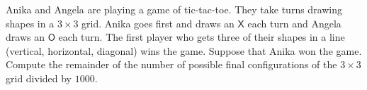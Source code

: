 Anika and Angela are playing a game of tic-tac-toe. They take turns drawing shapes in a $3\times 3$ grid. Anika goes first and draws an $\mathsf{X}$ each turn and Angela draws an $\mathsf{O}$ each turn. The first player who gets three of their shapes in a line (vertical, horizontal, diagonal) wins the game. Suppose that Anika won the game. Compute the remainder of the number of possible final configurations of the $3\times 3$ grid divided by $1000$.
